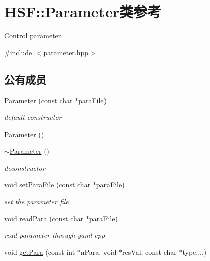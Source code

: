 \hypertarget{classHSF_1_1Parameter}{
\section{HSF::Parameter类参考}
\label{classHSF_1_1Parameter}
}


Control parameter.  


{\ttfamily \#include $<$parameter.hpp$>$}\subsection*{公有成员}
\begin{DoxyCompactItemize}
\item 
\hyperlink{classHSF_1_1Parameter_a99364861f624da340a461c0226bcca63}{Parameter} (const char $\ast$paraFile)
\begin{DoxyCompactList}\small\item\em default constructor \item\end{DoxyCompactList}\item 
\hyperlink{classHSF_1_1Parameter_a6c1b209f15999e6ddf19d756adbdbae8}{Parameter} ()
\item 
\hyperlink{classHSF_1_1Parameter_ac59ca61eccd3d1e8ad38133c06ea8178}{$\sim$Parameter} ()
\begin{DoxyCompactList}\small\item\em deconstructor \item\end{DoxyCompactList}\item 
void \hyperlink{classHSF_1_1Parameter_a535c67d4b12636e498b98d3e6f0723d1}{setParaFile} (const char $\ast$paraFile)
\begin{DoxyCompactList}\small\item\em set the parameter file \item\end{DoxyCompactList}\item 
void \hyperlink{classHSF_1_1Parameter_a1701a921961849020f7dcd6bf2a8d150}{readPara} (const char $\ast$paraFile)
\begin{DoxyCompactList}\small\item\em read parameter through yaml-\/cpp \item\end{DoxyCompactList}\item 
void \hyperlink{classHSF_1_1Parameter_a43cde4ecf939bca66b2dae7566eea056}{getPara} (const int $\ast$nPara, void $\ast$resVal, const char $\ast$type,...)

\end{DoxyCompactItemize}
